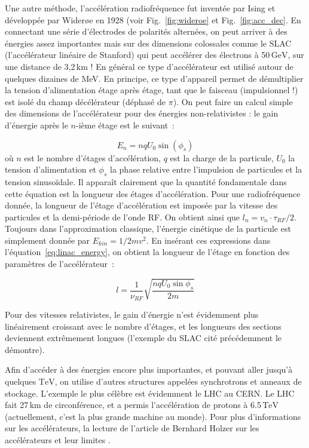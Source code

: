 \documentclass[a4paper]{book}
\begin{document}
Une autre méthode, l'accélération radiofréquence fut inventée par Ising et développée par Wider{\o}e en 1928 (voir Fig.~\ref{fig:wideroe} et Fig.~\ref{fig:acc_dec}. En connectant une série d'électrodes de polarités alternées, on peut arriver à des énergies assez importantes mais sur des dimensions colossales comme le SLAC (l'accélérateur linéaire de Stanford) qui peut accélérer des électrons à 50$\,\mathrm{GeV}$, sur une distance de 3,2$\,\mathrm{km}$ ! En général ce type d'accélérateur est utilisé autour de quelques dizaines de MeV. En principe, ce type d'appareil permet de démultiplier la tension d'alimentation étage après étage, tant que le faisceau (impulsionnel !) est isolé du champ décélérateur (déphasé de $\pi$). On peut faire un calcul simple des dimensions de l'accélérateur pour des énergies non-relativistes : le gain d'énergie après le $n$-ième étage est le suivant~:

\begin{equation}
    E_n=nqU_0\sin\left(\phi_s\right)
    \label{eq:linac_energy}
\end{equation}
où $n$ est le nombre d'étages d'accélération, $q$ est la charge de la particule, $U_0$ la tension d'alimentation et $\phi_s$ la phase relative entre l'impulsion de particules et la tension sinusoïdale. 
Il apparaît clairement que la quantité fondamentale dans cette équation est la longueur des étages d'accélération. Pour une radiofréquence donnée, la longueur de l'étage d'accélération est imposée par la vitesse des particules et la demi-période de l'onde RF. On obtient ainsi que $l_n = v_n\cdot \tau_{RF}/2$. Toujours dans l'approximation classique, l'énergie cinétique de la particule est simplement donnée par $E_{kin} = 1/2mv^2$. En insérant ces expressions dans l'équation~\ref{eq:linac_energy}, on obtient la longueur de l'étage en fonction des paramètres de l'accélérateur~:

\begin{equation}
    l=\frac{1}{\nu_{RF}}\sqrt{\frac{nqU_0\sin{\phi_s}}{2m}}
\end{equation}

Pour des vitesses relativistes, le gain d'énergie n'est évidemment plus linéairement croissant avec le nombre d'étages, et les longueurs des sections deviennent extrêmement longues (l'exemple du SLAC cité précédemment le démontre). 

Afin d'accéder à des énergies encore plus importantes, et pouvant aller jusqu'à quelques $\mathrm{TeV}$, on utilise d'autres structures appelées synchrotrons et anneaux de stockage. L'exemple le plus célèbre est évidemment le LHC au CERN. Le LHC fait 27$\,\mathrm{km}$ de circonférence, et a permis l'accélération de protons à 6.5$\,\mathrm{TeV}$ (actuellement, c'est la plus grande machine au monde). 
Pour plus d'informations sur les accélérateurs, la lecture de l'article de Bernhard Holzer sur les accélérateurs et leur limites \cite{holzer}. 
\end{document}
